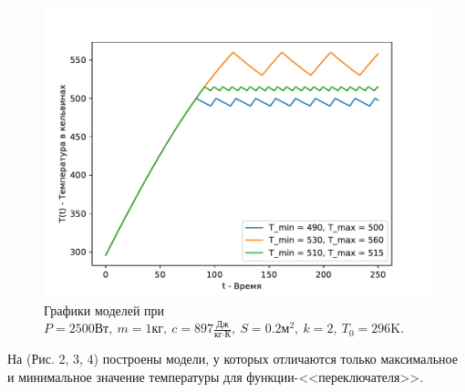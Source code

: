         \begin{figure}[H]
            \centering
            \includegraphics[width=12cm]{pictures/utug4.pdf}
            \caption{Графики моделей при $P = 2500 \text{Вт}, ~ m = 1 \text{кг}, ~ c = 897 \frac{\text{Дж}}{\text{кг} \cdot \text{К}}, ~ S = 0.2 \text{м}^2, ~ k = 2, ~ T_0 = 296 \text{K}$.}
        \end{figure}

        На (Рис. 2, 3, 4) построены модели, у которых отличаются только максимальное и минимальное значение температуры для функции-<<переключателя>>.

